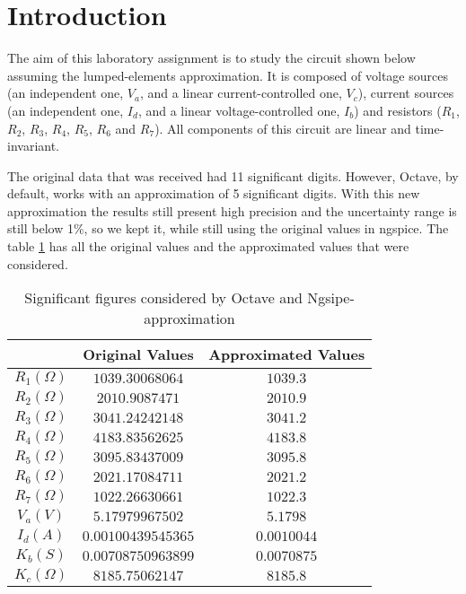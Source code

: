 \section{Introduction}
\label{sec:introduction}

\par
The aim of this laboratory assignment is to study the circuit shown below assuming the lumped-elements approximation. It is composed of voltage sources (an independent one, $V_a$, and a linear current-controlled one, $V_c$), current sources (an independent one, $I_d$, and a linear voltage-controlled one, $I_b$) and resistors ($R_1$, $R_2$, $R_3$, $R_4$, $R_5$, $R_6$ and $R_7$). All components of this circuit are linear and time-invariant.

The original data that was received had 11 significant digits. However, Octave, by default, works with an approximation of 5 significant digits. With this new approximation the results still present high precision and the uncertainty range is still below 1\%, so we kept it, while still using the original values in ngspice. The table \ref{tab:ap} has all the original values and the approximated values that were considered. 

\begin{table}[hbt!]
  \centering
  \begin{tabular}{|c|c|c|}
    \hline
    &           \textbf{Original Values}        & \textbf{Approximated Values}\\ \hline
    $R_1 (\Omega)$   &  $   1039.30068064   $     & $1039.3$\\ \hline
    $R_2 (\Omega)$   &  $   2010.9087471    $      & $2010.9$\\ \hline
    $R_3 (\Omega)$   &  $   3041.24242148   $    & $3041.2$\\ \hline
    $R_4 (\Omega)$   &  $   4183.83562625   $     & $4183.8$\\ \hline
    $R_5 (\Omega)$   &  $   3095.83437009   $     & $3095.8$\\ \hline
    $R_6 (\Omega)$   &  $   2021.17084711   $     & $2021.2$\\ \hline
    $R_7 (\Omega)$   &  $   1022.26630661   $     & $1022.3$\\\hline
    $V_a (V)$   &  $   5.17979967502   $     & $5.1798$\\ \hline
    $I_d (A)$   &  $    0.00100439545365     $     & $0.0010044$\\ \hline
    $K_b (S)$   &  $    0.00708750963899     $     & $0.0070875$\\ \hline
    $K_c (\Omega)$   &     $8185.75062147    $     & $8185.8$\\ \hline
  \end{tabular}
  \caption{Significant figures considered by Octave and Ngsipe- approximation} 
  \label{tab:ap}
\end{table}

